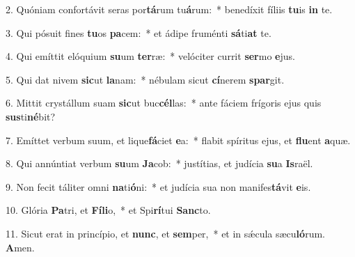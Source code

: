 2. Quóniam confortávit seras por\textbf{tá}rum tu\textbf{á}rum:~*  benedíxit fíliis \textbf{tu}is \textbf{in} te.\

3. Qui pósuit fines \textbf{tu}os \textbf{pa}cem:~*  et ádipe fruménti \textbf{sá}ti\textbf{at} te.\

4. Qui emíttit elóquium \textbf{su}um \textbf{ter}ræ:~*  velóciter currit \textbf{ser}mo \textbf{e}jus.\

5. Qui dat nivem \textbf{sic}ut \textbf{la}nam:~*  nébulam sicut \textbf{cí}nerem \textbf{spar}git.\

6. Mittit crystállum suam \textbf{sic}ut buc\textbf{cél}las:~*  ante fáciem frígoris ejus quis \textbf{sus}ti\textbf{né}bit?\

7. Emíttet verbum suum, et lique\textbf{fá}ciet \textbf{e}a:~*  flabit spíritus ejus, et \textbf{flu}ent \textbf{a}quæ.\

8. Qui annúntiat verbum \textbf{su}um \textbf{Ja}cob:~*  justítias, et judícia \textbf{su}a \textbf{Is}raël.\

9. Non fecit táliter omni \textbf{na}ti\textbf{ó}ni:~*  et judícia sua non manifes\textbf{tá}vit \textbf{e}is.\

10. Glória \textbf{Pa}tri, et \textbf{Fí}\textbf{li}o,~*  et Spi\textbf{rí}tui \textbf{Sanc}to.\

11. Sicut erat in princípio, et \textbf{nunc}, et \textbf{sem}per,~*  et in sǽcula sæcu\textbf{ló}rum. \textbf{A}men.\


